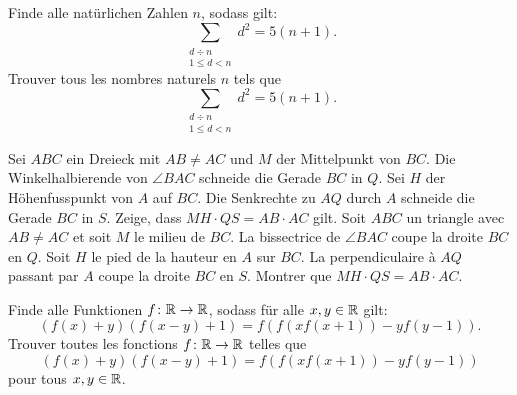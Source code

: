 \documentclass[language=french,style=exam]{smo} %
\begin{document}
\begin{enumerate}
{\item[\textbf{7.}] %
\ifgerman %
Finde alle natürlichen Zahlen $n$, sodass gilt:
\[
\sum_{\substack{d\div n\\ 1\leq d < n}} d^2=5(n+1).
\]
\fi
\iffrench %
Trouver tous les nombres naturels $n$ tels que
\[
\sum_{\substack{d\div n\\ 1\leq d < n}} d^2=5(n+1).
\]
\fi
\ifitalian %
\fi

\bigskip
\bigskip

\item[\textbf{8.}] %

\ifgerman %
Sei $ABC$ ein Dreieck mit $AB \neq AC$ und $M$ der Mittelpunkt von $BC$. Die Winkelhalbierende von $\angle BAC$ schneide die Gerade $BC$ in $Q$. Sei $H$ der Höhenfusspunkt von $A$ auf $BC$. Die Senkrechte zu $AQ$ durch $A$ schneide die Gerade $BC$ in $S$. Zeige, dass $MH \cdot QS = AB \cdot AC$ gilt.
\fi
\iffrench %
Soit $ABC$ un triangle avec $AB\neq AC$ et soit $M$ le milieu de $BC$. La bissectrice de $\angle BAC$ coupe la droite $BC$ en $Q$. Soit $H$ le pied de la hauteur en $A$ sur $BC$. La perpendiculaire à $AQ$ passant par $A$ coupe la droite $BC$ en $S$. Montrer que $MH\cdot QS = AB \cdot AC$.
\fi
\ifitalian %
\fi

\bigskip
\bigskip

\item[\textbf{9.}] %
\ifgerman %
Finde alle Funktionen $f\colon \mathbb{R} \to \mathbb{R}$, sodass für alle $x,y\in\mathbb{R}$ gilt:
\[
(f(x)+y)(f(x-y)+1)= f(f(xf(x+1)) - yf(y-1)).
\]
\fi
\iffrench %
Trouver toutes les fonctions $f\colon \mathbb{R} \to \mathbb{R}$ telles que
\[
(f(x)+y)(f(x-y)+1)= f(f(xf(x+1)) - yf(y-1))
\]
pour tous $x,y\in \mathbb{R} $.
\fi
\ifitalian %
\fi
}

\end{enumerate}
\end{document}

